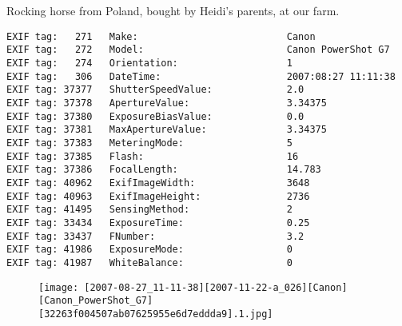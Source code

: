 \section{\protect{}}
\noindent Rocking horse from Poland, bought by Heidi's parents, at our farm.
\noindent
\begin{lstlisting}
EXIF tag:   271   Make:                          Canon
EXIF tag:   272   Model:                         Canon PowerShot G7
EXIF tag:   274   Orientation:                   1
EXIF tag:   306   DateTime:                      2007:08:27 11:11:38
EXIF tag: 37377   ShutterSpeedValue:             2.0
EXIF tag: 37378   ApertureValue:                 3.34375
EXIF tag: 37380   ExposureBiasValue:             0.0
EXIF tag: 37381   MaxApertureValue:              3.34375
EXIF tag: 37383   MeteringMode:                  5
EXIF tag: 37385   Flash:                         16
EXIF tag: 37386   FocalLength:                   14.783
EXIF tag: 40962   ExifImageWidth:                3648
EXIF tag: 40963   ExifImageHeight:               2736
EXIF tag: 41495   SensingMethod:                 2
EXIF tag: 33434   ExposureTime:                  0.25
EXIF tag: 33437   FNumber:                       3.2
EXIF tag: 41986   ExposureMode:                  0
EXIF tag: 41987   WhiteBalance:                  0

\end{lstlisting}
\clearpage
\begin{figure}
\raggedleft
\texttt{[image: [2007-08-27\_11-11-38][2007-11-22-a\_026][Canon][Canon\_PowerShot\_G7][32263f004507ab07625955e6d7eddda9].1.jpg]}
\end{figure}


\clearpage
